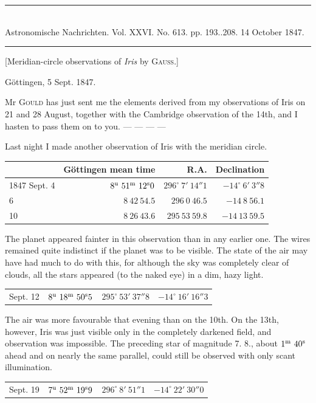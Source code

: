 \clearpage
\hypertarget{native-479-lower}{}
\begin{center}
\rule{0.55\linewidth}{0.4pt}\\[2pt]
Astronomische Nachrichten. Vol. XXVI. No. 613. pp. 193..208. 14 October 1847.\\[2pt]
\rule{0.55\linewidth}{0.4pt}
\end{center}
\begin{center}[Meridian-circle observations of \emph{Iris} by \textsc{Gauss}.]\end{center}
\begin{flushright}Göttingen, 5 Sept. 1847.\end{flushright}

Mr \textsc{Gould} has just sent me the elements derived from my observations of Iris on 21 and 28 August, together with the Cambridge observation of the 14th, and I hasten to pass them on to you. --- --- --- ---

Last night I made another observation of Iris with the meridian circle.

\begin{center}
\setlength{\tabcolsep}{4pt}
\begin{tabular}{l|r|r|r}
 & Göttingen mean time & R.A. & Declination \\\hline
1847 Sept. 4 & $8^{\rm u}\ 51^{\rm m}\ 12^{\rm s}0$ & $296^\circ\ 7'\ 14''1$ & $-14^\circ\ 6'\ 3''8$ \\
\hfill 6 & $8\ 42\ 54.5$ & $296\ 0\ 46.5$ & $-14\ 8\ 56.1$ \\
\hfill 10 & $8\ 26\ 43.6$ & $295\ 53\ 59.8$ & $-14\ 13\ 59.5$ \\
\end{tabular}
\end{center}

The planet appeared fainter in this observation than in any earlier one. The wires remained quite indistinct if the planet was to be visible. The state of the air may have had much to do with this, for although the sky was completely clear of clouds, all the stars appeared (to the naked eye) in a dim, hazy light.

\begin{center}
\begin{tabular}{l|r|r|r}
Sept. 12 & $8^{\rm u}\ 18^{\rm m}\ 50^{\rm s}5$ & $295^\circ\ 53'\ 37''8$ & $-14^\circ\ 16'\ 16''3$ \\
\end{tabular}
\end{center}

The air was more favourable that evening than on the 10th. On the 13th, however, Iris was just visible only in the completely darkened field, and observation was impossible. The preceding star of magnitude 7. 8., about $1^{\rm m}\ 40^{\rm s}$ ahead and on nearly the same parallel, could still be observed with only scant illumination.

\begin{center}
\begin{tabular}{l|r|r|r}
Sept. 19 & $7^{\rm u}\ 52^{\rm m}\ 19^{\rm s}9$ & $296^\circ\ 8'\ 51''1$ & $-14^\circ\ 22'\ 30''0$ \\
\end{tabular}
\end{center}
